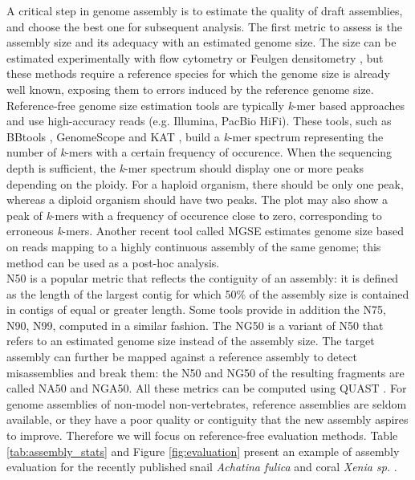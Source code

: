 A critical step in genome assembly is to estimate the quality of draft assemblies, and choose the best one for subsequent analysis. The first metric to assess is the assembly size and its adequacy with an estimated genome size. The size can be estimated experimentally with flow cytometry or Feulgen densitometry \cite{mulligan2014}, but these methods require a reference species for which the genome size is already well known, exposing them to errors induced by the reference genome size. Reference-free genome size estimation tools are typically \textit{k}-mer based approaches and use high-accuracy reads (e.g. Illumina, PacBio HiFi). These tools, such as BBtools \cite{bbtools}, GenomeScope \cite{genomescope} and KAT \cite{kat_evaluation}, build a \textit{k}-mer spectrum representing the number of \textit{k}-mers with a certain frequency of occurence. When the sequencing depth is sufficient, the \textit{k}-mer spectrum should display one or more peaks depending on the ploidy. For a haploid organism, there should be only one peak, whereas a diploid organism should have two peaks. The plot may also show a peak of \textit{k}-mers with a frequency of occurence close to zero, corresponding to erroneous \textit{k}-mers. Another recent tool called MGSE \cite{mgse} estimates genome size based on reads mapping to a highly continuous assembly of the same genome; this method can be used as a post-hoc analysis. \\

N50 is a popular metric that reflects the contiguity of an assembly: it is defined as the length of the largest contig for which 50\% of the assembly size is contained in contigs of equal or greater length. Some tools provide in addition the N75, N90, N99, computed in a similar fashion. The NG50 is a variant of N50 that refers to an estimated genome size instead of the assembly size. The target assembly can further be mapped against a reference assembly to detect misassemblies and break them: the N50 and NG50 of the resulting fragments are called NA50 and NGA50. All these metrics can be computed using QUAST \cite{quast}. For genome assemblies of non-model non-vertebrates, reference assemblies are seldom available, or they have a poor quality or contiguity that the new assembly aspires to improve. Therefore we will focus on reference-free evaluation methods. Table \ref{tab:assembly_stats} and Figure \ref{fig:evaluation} present an example of assembly evaluation for the recently published snail \textit{Achatina fulica} \cite{achatina_fulica} and coral \textit{Xenia sp.} \cite{xenia_sp}. \\

